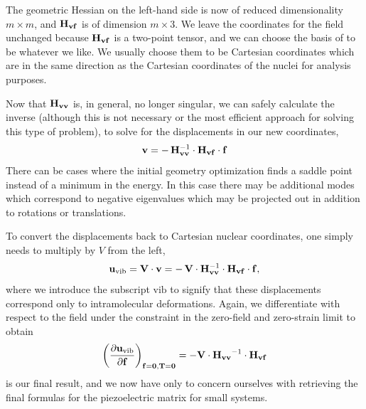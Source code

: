 The geometric Hessian on the left-hand side is now of reduced dimensionality $m \times m$, and ${\mathbf H}_{{\bf{v}} {\bf{f}}}$ is of
dimension $m \times 3$.  
We leave the coordinates for the field unchanged because ${\bf{H_{{\ensuremath{\bf{v}}}{\ensuremath{\bf{f}}}}}}$ is a two-point tensor, and we can choose the basis of \ff to be whatever we like.  
We usually choose them to be Cartesian coordinates which are in the same direction as the Cartesian coordinates of the nuclei for analysis purposes.

Now that ${\bf{H_{{\ensuremath{\bf{v}}}{\ensuremath{\bf{v}}}}}}$ is, in general, no longer singular, we can safely calculate the inverse (although this is
not necessary or the most efficient approach for solving this type of problem), to solve for the displacements in our new
coordinates, 
\begin{equation}
\label{eq:veq}
{\ensuremath{\bf{v}}} = - \, {\mathbf H}_{{\bf{v}} {\bf{v}}}^{-1} \cdot {\bf{H_{{\ensuremath{\bf{v}}}{\ensuremath{\bf{f}}}}}} \cdot {\ensuremath{\bf{f}}}
\end{equation}
There can be cases where the initial geometry optimization finds a saddle point instead of a minimum in the energy.  In
this case there may be additional modes which correspond to negative eigenvalues which may be projected out in addition
to rotations or translations. 

To convert the displacements back to Cartesian nuclear coordinates, one simply needs to multiply by $V$ from the left, 
\begin{equation}
{\ensuremath{\bf{u}}}_{\mathrm{vib}} = {\mathbf V}\cdot {\ensuremath{\bf{v}}} = - \, {\mathbf V} \cdot {\mathbf H}_{{\bf{v}} {\bf{v}}}^{-1} \cdot {\mathbf H}_{{\bf{v}} {\bf{f}}} \cdot {\ensuremath{\bf{f}}},
\end{equation}
where we introduce the subscript $\mathrm{vib}$ to signify that these displacements correspond only to intramolecular
deformations. 
Again, we differentiate with respect to the field under the constraint in the zero-field and zero-strain limit to obtain 
\begin{equation}
  \label{eq:finalDxdf}
  \left( {\frac{\partial {\ensuremath{\bf{u}}}_{\mathrm{vib}}}{\partial {\ensuremath{\bf{f}}}}} \right)_{{\mathbf f} = {\mathbf 0}, {\mathbf T} = {\mathbf 0}} = 
  - {\bf{V}} \cdot {\bf{H_{{\ensuremath{\bf{v}}}{\ensuremath{\bf{v}}}}}}^{-1} \cdot {\bf{H_{{\ensuremath{\bf{v}}}{\ensuremath{\bf{f}}}}}}
\end{equation}
 is our final result, and we now have only to concern ourselves with retrieving the final
formulas for the  piezoelectric matrix for small systems.

